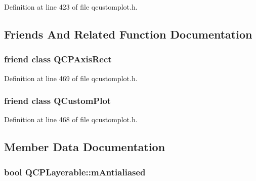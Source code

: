 Definition at line 423 of file qcustomplot.\-h.



\subsection{Friends And Related Function Documentation}
\hypertarget{class_q_c_p_layerable_acbf20ecb140f66c5fd1bc64ae0762990}{
\subsubsection[{Q\-C\-P\-Axis\-Rect}]{\setlength{\rightskip}{0pt plus 5cm}friend class {\bf Q\-C\-P\-Axis\-Rect}\hspace{0.3cm}{\ttfamily [friend]}}}\label{class_q_c_p_layerable_acbf20ecb140f66c5fd1bc64ae0762990}


Definition at line 469 of file qcustomplot.\-h.

\hypertarget{class_q_c_p_layerable_a1cdf9df76adcfae45261690aa0ca2198}{
\subsubsection[{Q\-Custom\-Plot}]{\setlength{\rightskip}{0pt plus 5cm}friend class {\bf Q\-Custom\-Plot}\hspace{0.3cm}{\ttfamily [friend]}}}\label{class_q_c_p_layerable_a1cdf9df76adcfae45261690aa0ca2198}


Definition at line 468 of file qcustomplot.\-h.



\subsection{Member Data Documentation}
\hypertarget{class_q_c_p_layerable_a3ab45a4c76a3333ce42eb217a81733ec}{
\subsubsection[{m\-Antialiased}]{\setlength{\rightskip}{0pt plus 5cm}bool Q\-C\-P\-Layerable\-::m\-Antialiased\hspace{0.3cm}{\ttfamily [protected]}}}\label{class_q_c_p_layerable_a3ab45a4c76a3333ce42eb217a81733ec}


